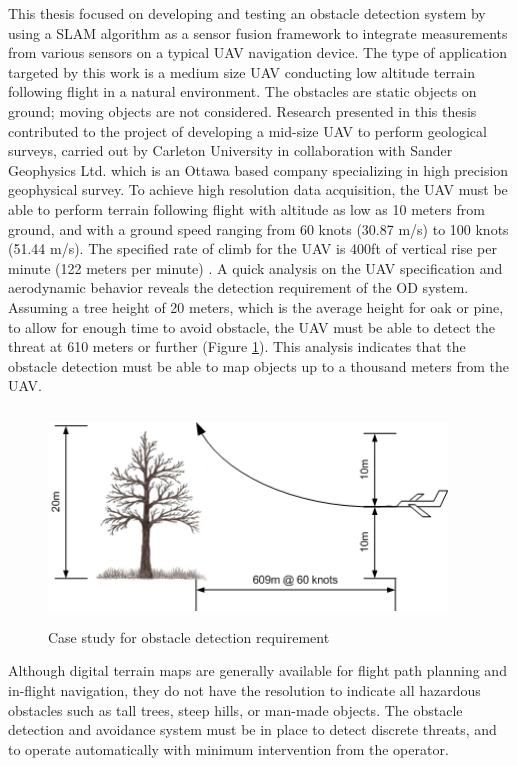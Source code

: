 This thesis focused on developing and testing an obstacle detection system by
using a SLAM algorithm as a sensor fusion framework to integrate
measurements from various sensors on a typical UAV navigation device.
The type of application targeted by this work is a medium size UAV
conducting low altitude terrain following flight in a natural
environment. The obstacles are static objects on ground; moving
objects are not considered. Research presented in this thesis
contributed to the project of developing a mid-size UAV to perform
geological surveys, carried out by Carleton University in
collaboration with Sander Geophysics Ltd. which is an Ottawa based
company specializing in high precision geophysical survey. To achieve
high resolution data acquisition, the UAV must be able to perform
terrain following flight with altitude as low as 10 meters from
ground, and with a ground speed ranging from 60 knots (30.87 m/s) to 100
knots (51.44 m/s). The specified rate of climb for the UAV is 400ft of
vertical rise per minute (122 meters per minute)
\cite{james_geosurv_2008}. A quick analysis on the UAV specification
and aerodynamic behavior reveals the detection requirement of the OD
system. Assuming a tree height of 20 meters, which is the average
height for oak or pine, to allow for enough time to avoid obstacle,
the UAV must be able to detect the threat at 610 meters or further
(Figure \ref{ob}). This analysis indicates that the obstacle detection
must be able to map objects up to a thousand meters from the UAV.

\begin{figure}[h]
\centering
\includegraphics[width=300pt,height=160pt]{./Figures/ProblemStatement.png}
\caption {Case study for obstacle detection requirement}
\label{ob}
\end{figure}

Although digital terrain maps are generally available for flight path
planning and in-flight navigation, they do not have the resolution to
indicate all hazardous obstacles such as tall trees, steep hills, or
man-made objects. The obstacle detection and avoidance system must be
in place to detect discrete threats, and to operate automatically with
minimum intervention from the operator.

